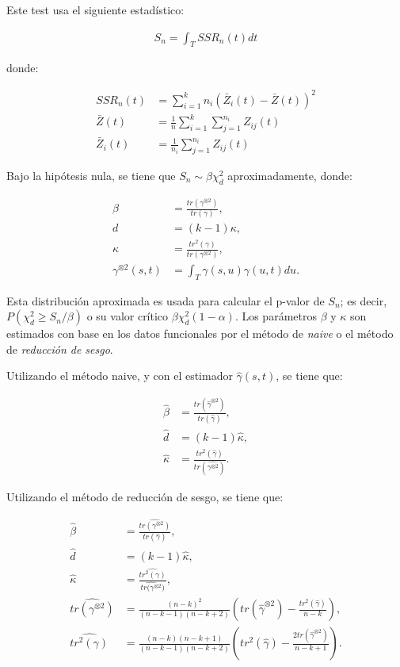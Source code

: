 \documentclass[
]{book}
\begin{document}
Este test usa el siguiente estadístico:

\begin{align*}
    S_n=\int_T SSR_n(t)dt 
\end{align*}

donde:

\begin{align*}
     SSR_n(t)&=\sum_{i=1}^k n_i(\bar{Z}_i(t)-\bar{Z}(t))^2\\
     \bar{Z}(t)&=\frac{1}{n}\sum_{i=1}^k \sum_{j=1}^{n_i}Z_{ij}(t)\\
     \bar{Z}_i(t)&=\frac{1}{n_i}\sum_{j=1}^{n_i}Z_{ij}(t)
 \end{align*}

Bajo la hipótesis nula, se tiene que \(S_n\sim \beta \chi_d^2\) aproximadamente, donde:

\begin{align*}
    \beta &=\frac{tr(\gamma^{\otimes 2})}{tr(\gamma)},\\
    d&=(k-1)\kappa,\\
    \kappa&=\frac{tr^2(\gamma)}{tr(\gamma^{\otimes 2})},\\
    \gamma^{\otimes 2}(s,t)&=\int_T \gamma(s,u)\gamma(u,t)du.
\end{align*}

Esta distribución aproximada es usada para calcular el p-valor de \(S_n\); es decir, \(P(\chi_d^2\geq S_n/\beta)\) o su valor crítico \(\beta\chi_d^2(1-\alpha)\). Los parámetros \(\beta\) y \(\kappa\) son estimados con base en los datos funcionales por el método de \textit{naive} o el método de \textit{reducción de sesgo}.

Utilizando el método naive, y con el estimador \(\hat{\gamma}(s,t)\), se tiene que:

\begin{align*}
    \hat{\beta}&=\frac{tr(\hat{\gamma}^{\otimes 2})}{tr(\hat{\gamma})},\\
    \hat{d}&=(k-1)\hat{\kappa},\\
    \hat{\kappa}&=\frac{tr^2(\hat{\gamma})}{tr(\hat{\gamma^{\otimes 2}})}.
\end{align*}

Utilizando el método de reducción de sesgo, se tiene que:

\begin{align*}
    \hat{\beta}&=\frac{\widehat{tr(\gamma^{\otimes 2})}}{tr(\hat{\gamma})},\\
    \hat{d}&=(k-1)\hat{\kappa},\\
    \hat{\kappa}&=\frac{\widehat{tr^2(\gamma)}}{\widehat{tr(\gamma^{\otimes 2}})},\\
    \widehat{tr(\gamma^{\otimes 2})}&=\frac{(n-k)^2}{(n-k-1)(n-k+2)}\left(tr(\hat{\gamma}^{\otimes 2})-\frac{tr^2(\hat{\gamma})}{n-k} \right),\\
    \widehat{tr^2(\gamma)}&=\frac{(n-k)(n-k+1)}{(n-k-1)(n-k+2)}\left(tr^2(\hat{\gamma})-\frac{2tr(\hat{\gamma}^{\otimes 2})}{n-k+1}\right).
\end{align*}
\end{document}
